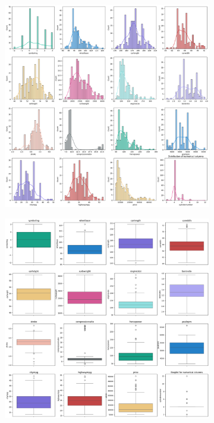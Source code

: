 \documentclass{article} %
\begin{document}
 \begin{figure}[t]
    \centering
    \begin{subfigure}{.49\textwidth}  %
        \centering
        \includegraphics[width=1.0\linewidth]{./figures/data1.png}
        \label{fig:distribution}
        \vspace{-5pt}
    \end{subfigure}
    \hfill %
    \begin{subfigure}{.49\textwidth}
        \centering
        \includegraphics[width=1.0\linewidth]{./figures/data2.png}

\end{subfigure}
\end{figure}
\end{document}
